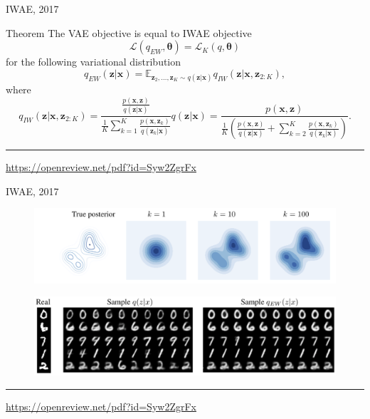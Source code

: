 \documentclass{beamer}
\newcommand{\bx}{\mathbf{x}}
\newcommand{\bz}{\mathbf{z}}
\newcommand{\btheta}{\boldsymbol{\theta}}
\begin{document}
\begin{frame}{IWAE, 2017}
\begin{block}{Theorem}
	The VAE objective is equal to IWAE objective 
	\[
	\mathcal{L}(q_{EW}, \btheta) = \mathcal{L}_K(q, \btheta)
	\]
	for the following variational distribution
	\[
	q_{EW}(\bz | \bx) = \mathbb{E}_{\bz_2, \dots, \bz_K \sim q(\bz | \bx)} q_{IW}(\bz | \bx, \bz_{2:K}),
	\]
	where \[
	q_{IW}(\bz | \bx, \bz_{2:K}) = \frac{\frac{p(\bx, \bz)}{q(\bz | \bx)}}{\frac{1}{K} \sum_{k=1}^K \frac{p(\bx, \bz_k)}{q(\bz_k | \bx)}} q(\bz | \bx) = \frac{p(\bx, \bz)}{\frac{1}{K}\left( \frac{p(\bx, \bz)}{q(\bz | \bx)} + \sum_{k=2}^K \frac{p(\bx, \bz_k)}{q(\bz_k | \bx)}\right)}.
	\]
\end{block}

\vfill
\hrule\medskip
{\scriptsize \href{https://openreview.net/pdf?id=Syw2ZgrFx}{https://openreview.net/pdf?id=Syw2ZgrFx}}
\end{frame}
\begin{frame}{IWAE, 2017}
\begin{figure}
	\centering
	\includegraphics[width=\linewidth]{figs/IWAE_1.png}
\end{figure}
\begin{figure}
	\centering
	\includegraphics[width=\linewidth]{figs/IWAE_2.png}
\end{figure}

\vfill
\hrule\medskip
{\scriptsize \href{https://openreview.net/pdf?id=Syw2ZgrFx}{https://openreview.net/pdf?id=Syw2ZgrFx}}
\end{frame}
\end{document}
